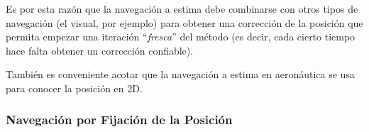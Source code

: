 Es por esta raz\'on que la navegaci\'on a estima debe combinarse con otros tipos de navegaci\'on (el visual, por ejemplo) para obtener una correcci\'on de la posici\'on que permita empezar una iteraci\'on ``\textit{fresca}'' del m\'etodo (es decir, cada cierto tiempo hace falta obtener un correcci\'on confiable).

Tambi\'en es conveniente acotar que la navegaci\'on a estima en aeron\'autica se usa para conocer la posici\'on en 2D.


\subsubsection{Navegaci\'on por Fijaci\'on de la Posici\'on}



